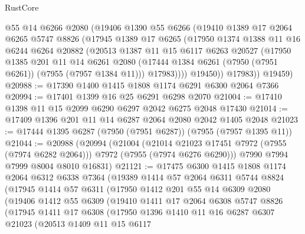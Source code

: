 \begin{lexlean}{RustCore}
\begin{coremodule}
          @55
          @14
          @6266
          @2080
          (@19406
            @1390
            @55
            @6266
            (@19410
              @1389
              @17
              @2064
              @6265
              @5747
              @8826
              (@17945
                @1389
                @17
                @6265
                (@17950
                  @1374
                  @1388
                  @11
                  @16
                  @6244
                  @6264
                  @20882
                  (@20513
                    @1387
                    @11
                    @15
                    @6117
                    @6263
                    @20527
                    (@17950
                      @1385
                      @201
                      @11
                      @14
                      @6261
                      @2080
                      (@17444 @1384 @6261 (@7950 (@7951 @6261)) (@7955 (@7957 @1384 @11)))
                      @17983))))
              @19450))
          @17983))
      @19459)
@20988 := @17390 @1400 @1415 @1808 @1174 @6291 @6300 @2064 @7366
@20994 := @17401 @1399 @16 @25 @6291 @6298 @2070
@21004 := @17410 @1398 @11 @15 @2099 @6290 @6297 @2042 @6275 @2048 @17430
@21014 := @17409 @1396 @201 @11 @14 @6287 @2064 @2080 @2042 @1405 @2048
@21023 := @17444 @1395 @6287 (@7950 (@7951 @6287)) (@7955 (@7957 @1395 @11))
@21044 := @20988
    (@20994
      (@21004
        (@21014 @21023 @17451 @7972 (@7955 (@7974 @6282 @2064)))
        @7972
        (@7955 (@7974 @6276 @6290)))
      @7990
      @7994
      @7999
      @8004
      @8010
      @16831)
@21121 := @17475
    @6300
    @1415
    @1808
    @1174
    @2064
    @6312
    @6338
    @7364
    (@19389
      @1414
      @57
      @2064
      @6311
      @5744
      @8824
      (@17945
        @1414
        @57
        @6311
        (@17950
          @1412
          @201
          @55
          @14
          @6309
          @2080
          (@19406
            @1412
            @55
            @6309
            (@19410
              @1411
              @17
              @2064
              @6308
              @5747
              @8826
              (@17945
                @1411
                @17
                @6308
                (@17950
                  @1396
                  @1410
                  @11
                  @16
                  @6287
                  @6307
                  @21023
                  (@20513
                    @1409
                    @11
                    @15
                    @6117

\end{coremodule}
\end{lexlean}
